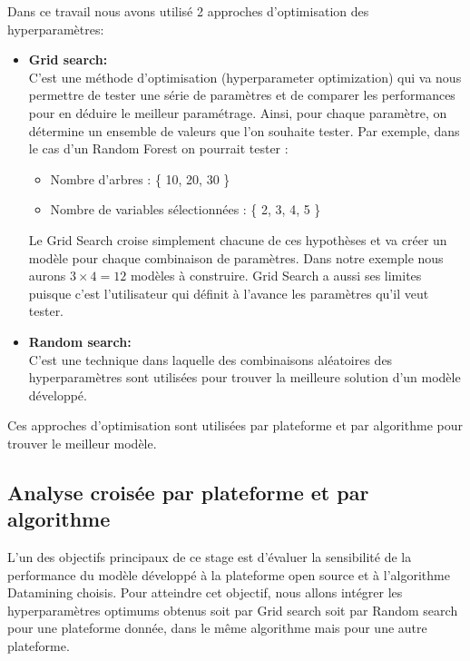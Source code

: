Dans ce travail nous avons utilisé 2 approches d'optimisation des hyperparamètres:\\
\begin{itemize}
    \item [\ding{109}] \textbf{Grid search:}\\ 
    
    C'est une méthode d’optimisation (hyperparameter optimization) qui va nous permettre de tester une série de paramètres et de comparer les performances pour en déduire le meilleur paramétrage. Ainsi, pour chaque paramètre, on détermine un ensemble de valeurs que l’on souhaite tester. Par exemple, dans le cas d’un Random Forest on pourrait tester :
    \begin{itemize}
        \item[\textbullet] Nombre d’arbres : \{ 10, 20, 30 \}
        \item[\textbullet] Nombre de variables sélectionnées : \{ 2, 3, 4, 5 \}\\
    \end{itemize}
    
Le Grid Search croise simplement chacune de ces hypothèses et va créer un modèle pour chaque combinaison de paramètres. Dans notre exemple nous aurons $3 \times 4 = 12$ modèles à construire. Grid Search a aussi ses limites puisque c’est l'utilisateur qui définit à l’avance les paramètres qu'il veut tester.\\ 
    \item [\ding{109}] \textbf{Random search:}\\ 
    
    C'est une technique dans laquelle des combinaisons aléatoires des hyperparamètres sont utilisées pour trouver la meilleure solution d'un modèle développé.\\
\end{itemize}

Ces approches d'optimisation sont utilisées par plateforme et par algorithme pour trouver le meilleur modèle. 

\subsection{Analyse croisée par plateforme et par algorithme} \label{sec:ana-cross}
L'un des objectifs principaux de ce stage est d'évaluer la sensibilité de la performance du modèle développé à la plateforme open source et à l'algorithme Datamining choisis. Pour atteindre cet objectif, nous allons intégrer les hyperparamètres optimums obtenus soit par Grid search soit par Random search pour une plateforme donnée, dans le même algorithme mais pour une autre plateforme.\\

